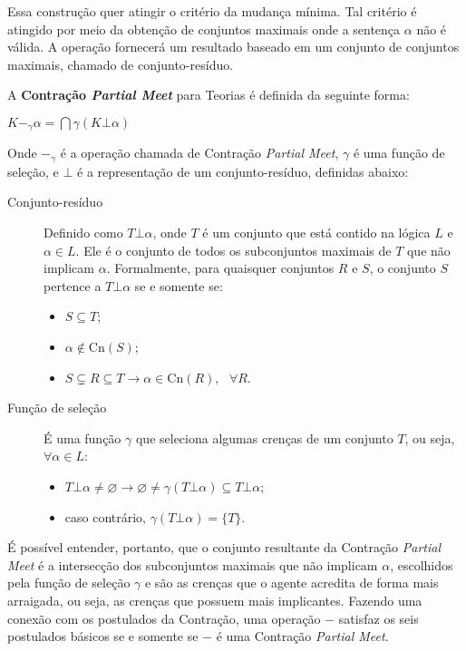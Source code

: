 Essa construção quer atingir o critério da mudança mínima. Tal critério é atingido por meio da obtenção de conjuntos maximais onde a sentença $ \alpha $ não é válida. A operação fornecerá um resultado baseado em um conjunto de conjuntos maximais, chamado de conjunto-resíduo.

A \textbf{Contração \textit{Partial Meet}} para Teorias é definida da seguinte forma: 

\begin{center}
	$ K -_{\gamma} \alpha = \bigcap \gamma(K \bot \alpha) $
\end{center}

Onde $ -_{\gamma} $ é a operação chamada de Contração \textit{Partial Meet}, $ \gamma $ é uma função de seleção, e $ \bot $ é a representação de um conjunto-resíduo, definidas abaixo:

\begin{description}
	\item[Conjunto-resíduo] Definido como $ T \bot \alpha $, onde $ T $ é um conjunto que está contido na lógica $ L $ e $ \alpha \in L $. Ele é o conjunto de todos os subconjuntos maximais de $ T $ que não implicam $ \alpha $. Formalmente, para quaisquer conjuntos $ R $ e $ S $, o conjunto $ S $ pertence a $ T \bot \alpha $ se e somente se:
	\begin{itemize}
		\item $ S \subseteq T $;
		\item $ \alpha \notin \text{Cn}(S) $;
		\item $ S \subsetneq R \subseteq T \to \alpha \in \text{Cn}(R), \text{ }\forall R$.
	\end{itemize}
	\item[Função de seleção] É uma função $ \gamma $ que seleciona algumas crenças de um conjunto $ T $, ou seja, $ \forall \alpha \in L $:
	\begin{itemize}
		\item $ T \bot \alpha \neq \varnothing \to \varnothing \neq \gamma(T \bot \alpha) \subseteq T \bot \alpha $;
		\item caso contrário, $ \gamma(T \bot \alpha) = \{T\} $.
	\end{itemize}
\end{description}

É possível entender, portanto, que o conjunto resultante da Contração \textit{Partial Meet} é a intersecção dos subconjuntos maximais que não implicam $ \alpha $, escolhidos pela função de seleção $ \gamma $ e são as crenças que o agente acredita de forma mais arraigada, ou seja, as crenças que possuem mais implicantes. Fazendo uma conexão com os postulados da Contração, uma operação $ - $ satisfaz os seis postulados básicos se e somente se $ - $ é uma Contração \textit{Partial Meet}.

